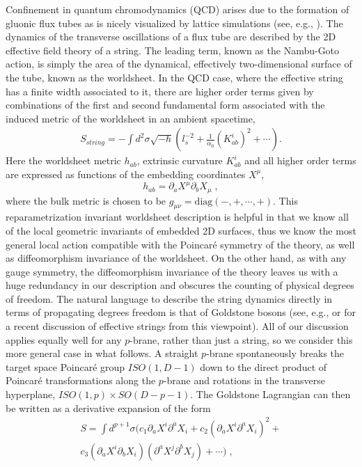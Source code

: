 \documentclass[%
 reprint,
 amsmath,amssymb,
 aps,
]{revtex4-1}
\begin{document}
Confinement in quantum chromodynamics (QCD) arises due to the formation of
gluonic flux tubes as is nicely visualized by lattice simulations (see, e.g., \cite{Bissey:2006bz}).
The dynamics of the transverse oscillations of a flux tube are
described by the 2D effective field theory of a string. The leading term, known as the
Nambu-Goto action, is simply the area of the dynamical, effectively two-dimensional surface
of the tube, known as the worldsheet. In the QCD case, where the effective string has a finite
width associated to it, there are higher order terms given by combinations of the first
and second fundamental form associated with the induced metric of the worldsheet in an
ambient spacetime,
\begin{eqnarray}
\label{diffaction}
    S_{string} = - \int d^2 \sigma \sqrt{- h} \left(
    l_s^{-2} + \frac{1}{\alpha_0} (K^i_{ab})^2 + \cdots \right).
\end{eqnarray}
Here the worldsheet metric $h_{ab}$, extrinsic curvature $K^i_{ab}$ and all higher order terms are expressed as functions of the embedding coordinates $X^\mu$,
\[
h_{ab}=\partial_a X^\mu\partial_bX_\mu\;,
\]
where the bulk metric is chosen to be $g_{\mu \nu} = \mathrm{diag}(-,+,\cdots,+)$.
This reparametrization invariant worldsheet description is helpful in that we know all
of the local geometric invariants of embedded 2D surfaces, thus we know the most general
local action compatible with the Poincar\'e symmetry of the theory, as
well as diffeomorphism invariance of the worldsheet. On the other hand, as with any gauge symmetry, the
diffeomorphism invariance of the theory leaves us with a huge redundancy in our description and obscures the counting of physical degrees of freedom.
The natural language to describe the string dynamics directly in terms of propagating degrees freedom  is that of Goldstone bosons
(see, e.g., \cite{Dubovsky:2012sh} or \cite{Aharony:2013ipa} for a recent discussion of effective strings from this viewpoint). All of our discussion applies equally well for any $p$-brane, rather than just a string,
so we consider this more general case in what follows.
A  straight $p$-brane spontaneously breaks the target space Poincar\'e group $ISO(1,D-1)$ down to the direct product of Poincar\'e
transformations along the $p$-brane and rotations in the transverse hyperplane,
$ISO(1,p)\times SO(D-p-1)$. The Goldstone Lagrangian can then be written
as a derivative expansion of the form
\begin{eqnarray}
\label{action}
S =  \int d^{p + 1} \sigma (c_1 \partial_a X^i \partial^a X_i +
    c_2 (\partial_a X^i \partial^a X_i)^2 +  \\
    c_3 (\partial_a X^i \partial_b X_i)(\partial^a X^j \partial^b X_j) + \cdots )\; , \nonumber
\end{eqnarray}
\end{document}
